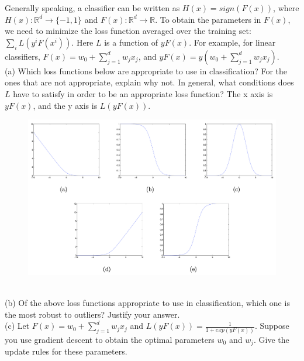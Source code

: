 \documentclass[12pt]{article}%
\begin{document}
Generally speaking, a classifier can be written as $H(x) = sign(F(x))$, where $H(x):\mathbb{R}^d \rightarrow \{-1, 1\}$ and $F(x): \mathbb{R}^d \rightarrow \mathbb{R}$. To obtain the parameters in $F(x)$, we need to minimize the loss function averaged over the training set: ${\textstyle \sum_{i}^{}}L(y^iF(x^i))$. Here $L$ is a function of $yF(x)$. For example, for linear classifiers, $F(x)=w_0 + {\textstyle \sum_{j=1}^{d}}w_jx_j$, and $yF(x) = y(w_0 + {\textstyle \sum_{j=1}^{d}}w_jx_j)$.
\vspace{1em}
\\
(a) Which loss functions below are appropriate to use in classification? For the ones that are not appropriate, explain why not. In general, what conditions does $L$ have to satisfy in order to be an appropriate loss function? The x axis is $yF(x)$, and the y axis is $L(yF(x))$.
\begin{figure}[htpb]
    \centering
    \includegraphics[scale=0.45]{partA_loss.png}
    \label{fig:enter-label}
\end{figure}
\vspace{1em}
\\
(b) Of the above loss functions appropriate to use in classification, which one is the most robust to outliers? Justify your answer.
\vspace{1em}
\\
(c) Let $F(x)=w_0+\sum_{j=1}^{d}w_jx_j$ and $L(yF(x))= \frac{1}{1+exp(yF(x))} $. Suppose you use gradient descent to obtain the optimal parameters $w_0$ and $w_j$. Give the update rules for these parameters.

\pagebreak
\end{document}
